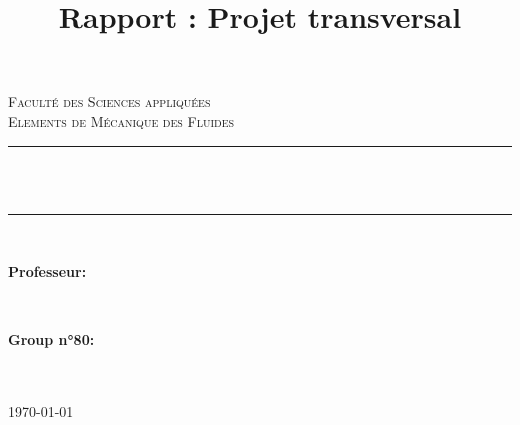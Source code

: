 \documentclass{article}
\author{}
\title{Rapport : Projet transversal  }											%
\makeatletter
\let\thetitle\@title
\makeatother
\begin{document}
\begin{titlepage}
	\centering
    \vspace*{0.5 cm}
    
    \textsc{\LARGE \newline\newline Faculté des Sciences appliquées}\\[2.0 cm]	%
	\textsc{\Large Elements de Mécanique des Fluides}\\[0.5 cm]				%
	\rule{\linewidth}{0.2 mm} \\[0.4 cm]
	{ \huge \bfseries \thetitle}\\
	\rule{\linewidth}{0.2 mm} \\[1.5 cm]
	
	\begin{minipage}{0.5\textwidth}
		\begin{flushleft} \large
			\textbf{Professeur:}\\
			\end{flushleft}
			\end{minipage}~
			\begin{minipage}{0.4\textwidth}
            
			\begin{flushright} \large
			\textbf{Group n°80:} \\
    \monthname\ \the\year
  \end{flushright}
        
	\end{minipage}\\[2 cm]
\today
 \end{titlepage}
\pagebreak
\end{document}
